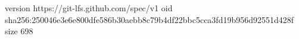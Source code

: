 version https://git-lfs.github.com/spec/v1
oid sha256:250046e3e6e800dfe586b30aebb8c79b4df22bbc5cca3fd19b956d92551d428f
size 698
